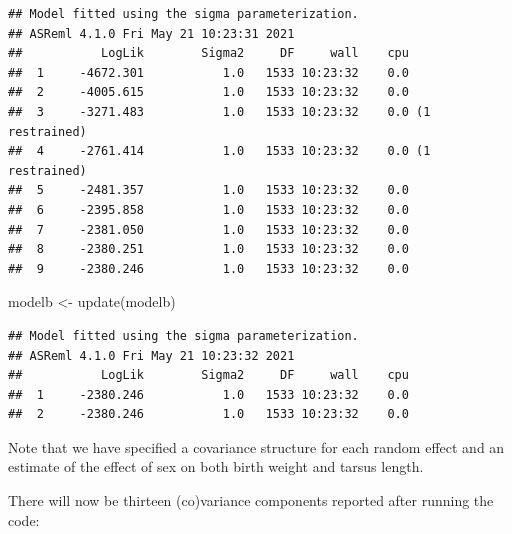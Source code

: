 \documentclass[
  12pt,
]{book}
\newenvironment{Shaded}{\begin{snugshade}}{\end{snugshade}}
\newcommand{\FunctionTok}[1]{\textcolor[rgb]{0.00,0.00,0.00}{#1}}
\newcommand{\NormalTok}[1]{#1}
\newcommand{\OtherTok}[1]{\textcolor[rgb]{0.56,0.35,0.01}{#1}}
\newcommand{\SpecialCharTok}[1]{\textcolor[rgb]{0.00,0.00,0.00}{#1}}
\begin{document}
\begin{verbatim}
## Model fitted using the sigma parameterization.
## ASReml 4.1.0 Fri May 21 10:23:31 2021
##           LogLik        Sigma2     DF     wall    cpu
##  1     -4672.301           1.0   1533 10:23:32    0.0
##  2     -4005.615           1.0   1533 10:23:32    0.0
##  3     -3271.483           1.0   1533 10:23:32    0.0 (1 restrained)
##  4     -2761.414           1.0   1533 10:23:32    0.0 (1 restrained)
##  5     -2481.357           1.0   1533 10:23:32    0.0
##  6     -2395.858           1.0   1533 10:23:32    0.0
##  7     -2381.050           1.0   1533 10:23:32    0.0
##  8     -2380.251           1.0   1533 10:23:32    0.0
##  9     -2380.246           1.0   1533 10:23:32    0.0
\end{verbatim}

\begin{Shaded}
\begin{Highlighting}[]
\NormalTok{modelb }\OtherTok{\textless{}{-}} \FunctionTok{update}\NormalTok{(modelb)}
\end{Highlighting}
\end{Shaded}

\begin{verbatim}
## Model fitted using the sigma parameterization.
## ASReml 4.1.0 Fri May 21 10:23:32 2021
##           LogLik        Sigma2     DF     wall    cpu
##  1     -2380.246           1.0   1533 10:23:32    0.0
##  2     -2380.246           1.0   1533 10:23:32    0.0
\end{verbatim}

Note that we have specified a covariance structure for each random effect and an estimate of the effect of sex on both birth weight and tarsus length.

There will now be thirteen (co)variance components reported after running the code:

\begin{Shaded}
\end{Shaded}
\end{document}
